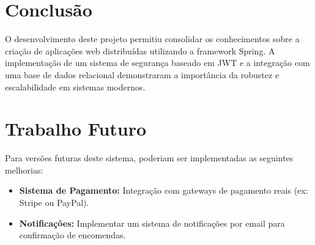 \documentclass[11pt,a4paper,oneside]{report}
\begin{document}
\section{Conclusão}
O desenvolvimento deste projeto permitiu consolidar os conhecimentos sobre a criação de aplicações web distribuídas utilizando a framework Spring. A implementação de um sistema de segurança baseado em JWT e a integração com uma base de dados relacional demonstraram a importância da robustez e escalabilidade em sistemas modernos.

\section{Trabalho Futuro}
Para versões futuras deste sistema, poderiam ser implementadas as seguintes melhorias:
\begin{itemize}
    \item \textbf{Sistema de Pagamento:} Integração com gateways de pagamento reais (ex: Stripe ou PayPal).
    \item \textbf{Notificações:} Implementar um sistema de notificações por email para confirmação de encomendas.

\end{itemize}



\nocite{*} 


\end{document}
